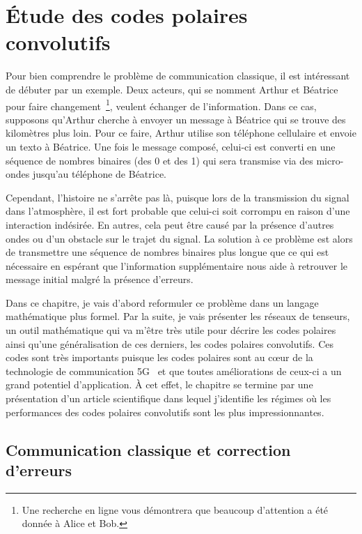 \begin{comment}
\end{comment}

\chapter{Étude des codes polaires convolutifs}
Pour bien comprendre le problème de communication classique,
il est intéressant de débuter par un exemple.
Deux acteurs, 
qui se nomment Arthur et Béatrice pour faire changement~\footnote{
  Une recherche en ligne vous démontrera que beaucoup d'attention a été donnée 
  à Alice et Bob. 
},
veulent échanger de l'information.
Dans ce cas,
supposons qu'Arthur cherche à envoyer un message à Béatrice qui se trouve
des kilomètres plus loin.
Pour ce faire,
Arthur utilise son téléphone cellulaire et envoie un texto à Béatrice.
Une fois le message composé,
celui-ci est converti en une séquence de nombres binaires (des 0 et des 1)
qui sera transmise via des micro-ondes jusqu'au téléphone de Béatrice.

Cependant, 
l'histoire ne s'arrête pas là,
puisque lors de la transmission du signal dans l'atmosphère,
il est fort probable que celui-ci soit corrompu en raison d'une interaction indésirée.
En autres, 
cela peut être causé par la présence d'autres ondes ou d'un obstacle sur le trajet du signal.
La solution à ce problème est alors de transmettre une séquence de nombres binaires
plus longue que ce qui est nécessaire en espérant que l'information supplémentaire
nous aide à retrouver le message initial malgré la présence d'erreurs.

Dans ce chapitre,
je vais d'abord reformuler ce problème dans un langage mathématique plus formel.  
Par la suite, 
je vais présenter les réseaux de tenseurs,
un outil mathématique qui va m'être très utile pour décrire les codes polaires 
ainsi qu'une généralisation de ces derniers, les codes polaires convolutifs.
Ces codes sont très importants puisque les codes polaires sont au cœur 
de la technologie de communication 5G~\cite{bioglio_design_2021}
et que toutes améliorations de ceux-ci a un grand potentiel d'application.
À cet effet,
le chapitre se termine par une présentation d'un article scientifique dans lequel
j'identifie les régimes où les performances des codes polaires convolutifs sont les plus impressionnantes.

\section{Communication classique et correction d'erreurs}


